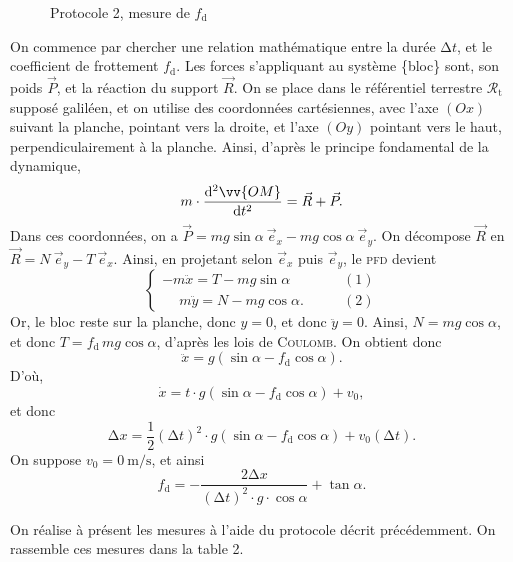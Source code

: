 \documentclass[a4paper,twocolumn,10pt]{report}
\begin{document}
	\begin{figure}[H]
		\centering
		\caption{Protocole 2, mesure de $f_\mathrm{d}$\/}
	\end{figure}

	On commence par chercher une relation mathématique entre la durée $\mathrm{\Delta}t$, et le coefficient de frottement $f_\mathrm{d}$. Les forces s'appliquant au système \{\:bloc\:\} sont, son poids $\vec{P}$, et la réaction du support $\vec{R}$. On se place dans le référentiel terrestre $\mathcal{R}_\mathrm{t}$\/ supposé galiléen, et on utilise des coordonnées cartésiennes, avec l'axe $(Ox)$\/ suivant la planche, pointant vers la droite, et l'axe $(Oy)$\/ pointant vers le haut, perpendiculairement à la planche.
	Ainsi, d'après le principe fondamental de la dynamique, \[
		m \cdot \frac{\mathrm{d}^2 \vv{OM}}{\mathrm{d}t^2} = \vec{R} + \vec{P}
	.\]
	Dans ces coordonnées, on a $\vec{P} = mg\sin \alpha \:\vec{e}_x - mg \cos \alpha \:\vec{e}_y$. On décompose $\vec{R}$\/ en $\vec{R} = N\: \vec{e}_y - T\: \vec{e}_x$.
	Ainsi, en projetant selon $\vec{e}_x$\/ puis $\vec{e}_y$, le \textsc{pfd} devient \[
		\begin{cases}
			-m\ddot{x} = T - mg\sin \alpha \quad\quad &(1) \\
			\mathord{\phantom{-}}m\ddot{y} = N -mg\cos \alpha.\quad\quad&(2)
		\end{cases}
	\]
	Or, le bloc reste sur la planche, donc $y = 0$, et donc $\ddot{y} = 0$. Ainsi, $N = mg \cos \alpha$, et donc $T = f_\mathrm{d}\,mg \cos \alpha$, d'après les lois de \textsc{Coulomb}.
	On obtient donc \[
		\ddot{x} = g (\sin \alpha - f_\mathrm{d} \cos \alpha)
	.\] D'où, \[
		\dot{x} = t \cdot g(\sin \alpha - f_\mathrm{d} \cos \alpha) + v_0,
	\] et donc \[
		\mathrm{\Delta}x = \frac{1}{2}(\mathrm{\Delta}t)^2 \cdot g(\sin \alpha - f_\mathrm{d} \cos \alpha) + v_0 (\mathrm{\Delta}t)
	.\]
	On suppose $v_0 = 0\:\mathrm{m}/\mathrm{s}$, et ainsi \[
		f_\mathrm{d} = -\frac{2 \mathrm{\Delta}x}{(\mathrm{\Delta}t)^2 \cdot g \cdot \cos \alpha} + \tan \alpha
	.\]

	On réalise à présent les mesures à l'aide du protocole décrit précédemment. On rassemble ces mesures dans la table 2.
\end{document}
